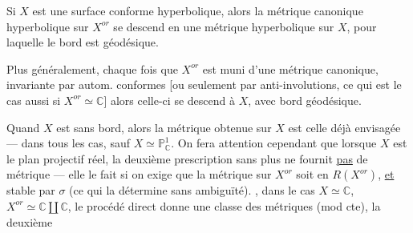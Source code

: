 Si $X$ est une surface conforme hyperbolique, alors la métrique canonique hyperbolique sur $X^{or}$ se descend en une métrique hyperbolique sur $X$, pour laquelle le bord est géodésique.

Plus généralement, chaque fois que $X^{or}$ est muni d'une métrique canonique, invariante par autom. conformes [ou seulement par anti-involutions, ce qui est le cas aussi si $X^{or}\simeq\mathbb C$] alors celle-ci se descend à $X$, avec bord géodésique.

Quand $X$ est sans bord,  alors  la métrique obtenue sur $X$ est celle déjà envisagée ---   dans tous les cas, sauf $X\simeq\mathbb P^1_{\mathbb C}$. On fera attention cependant que lorsque $X$ est le plan projectif réel, la deuxième prescription sans plus ne fournit \uline{pas} de métrique --- elle le fait si on exige que la métrique sur $X^{or}$ soit en $R(X^{or})$, \uline{et} stable par $\sigma$ (ce qui la détermine sans ambiguïté).  , dans le cas $X\simeq\mathbb C$, $X^{or}\simeq\mathbb C\amalg\mathbb C$, le procédé direct donne une classe des métriques (mod cte), la deuxième
